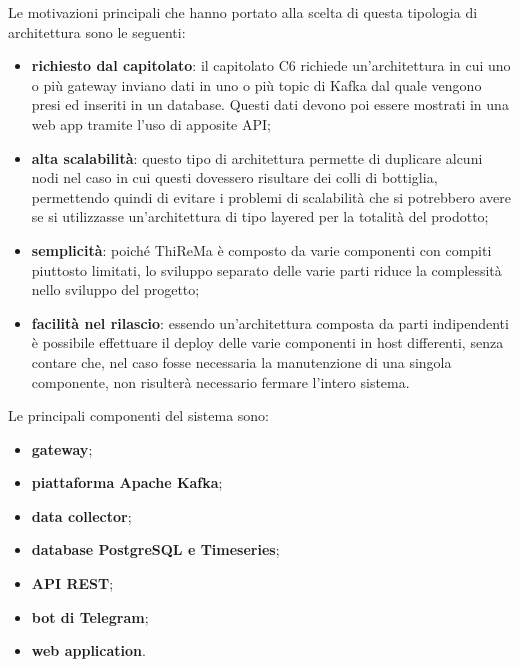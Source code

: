		Le motivazioni principali che hanno portato alla scelta di questa tipologia di architettura sono le seguenti:
		\begin{itemize}
		 	\item \textbf{richiesto dal capitolato}: il capitolato C6 richiede un'architettura in cui uno o più gateway inviano dati in uno o più topic di Kafka dal quale vengono presi ed inseriti in un database. Questi dati devono poi essere mostrati in una web app tramite l'uso di apposite API;
		 	\item \textbf{alta scalabilità}: questo tipo di architettura permette di duplicare alcuni nodi nel caso in cui questi dovessero risultare dei colli di bottiglia, permettendo quindi di evitare i problemi di scalabilità che si potrebbero avere se si utilizzasse un'architettura di tipo layered per la totalità del prodotto;
		 	\item \textbf{semplicità}: poiché ThiReMa è composto da varie componenti con compiti piuttosto limitati, lo sviluppo separato delle varie parti riduce la complessità nello sviluppo del progetto;
		 	\item \textbf{facilità nel rilascio}: essendo un'architettura composta da parti indipendenti è possibile effettuare il deploy delle varie componenti in host differenti, senza contare che, nel caso fosse necessaria la manutenzione di una singola componente, non risulterà necessario fermare l'intero sistema.
		\end{itemize}

		Le principali componenti del sistema sono:
		\begin{itemize}
		  	\item \textbf{gateway};
		  	\item \textbf{piattaforma Apache Kafka};
		  	\item \textbf{data collector};
		  	\item \textbf{database PostgreSQL e Timeseries};
		  	\item \textbf{API REST};
		  	\item \textbf{bot di Telegram};
		  	\item \textbf{web application}.    
		\end{itemize} 



			










